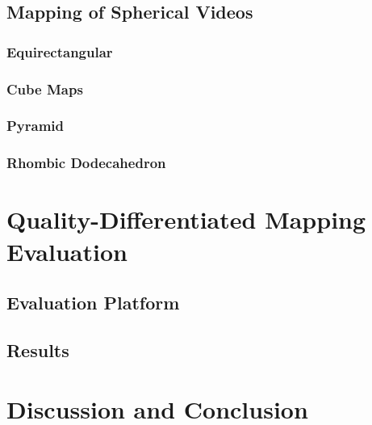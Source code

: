 \documentclass{sig-alternate}
\begin{document}
\subsection{Mapping of Spherical Videos}

\subsubsection{Equirectangular}

\subsubsection{Cube Maps}

\subsubsection{Pyramid}

\subsubsection{Rhombic Dodecahedron}

\section{Quality-Differentiated Mapping Evaluation}

\subsection{Evaluation Platform}

\subsection{Results}

\section{Discussion and Conclusion}

\newpage
%
%
  
%  

\end{document}

